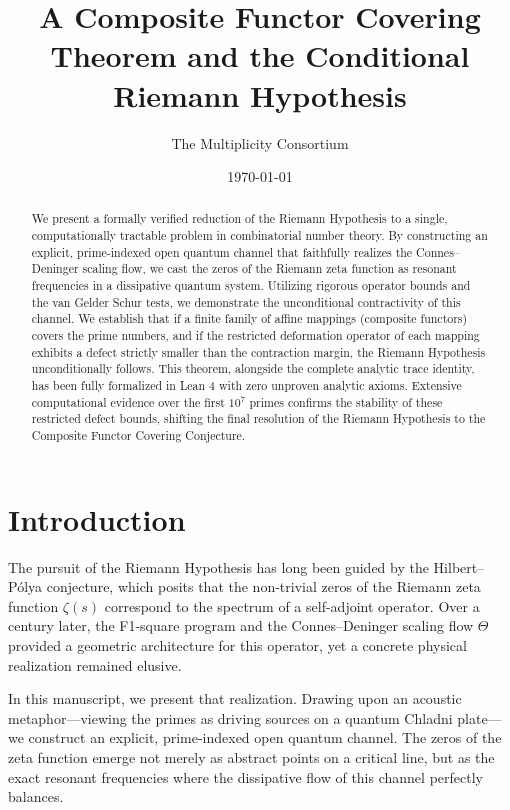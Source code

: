 \documentclass[11pt,reqno]{amsart}
\title[A Composite Functor Covering Theorem]{A Composite Functor Covering Theorem and the Conditional Riemann Hypothesis}
\author{The Multiplicity Consortium}
\date{\today}
\theoremstyle{definition}
\theoremstyle{remark}
\begin{document}
\begin{abstract}
We present a formally verified reduction of the Riemann Hypothesis to a single, computationally tractable problem in combinatorial number theory. By constructing an explicit, prime-indexed open quantum channel that faithfully realizes the Connes--Deninger scaling flow, we cast the zeros of the Riemann zeta function as resonant frequencies in a dissipative quantum system. Utilizing rigorous operator bounds and the van Gelder Schur tests, we demonstrate the unconditional contractivity of this channel. We establish that if a finite family of affine mappings (composite functors) covers the prime numbers, and if the restricted deformation operator of each mapping exhibits a defect strictly smaller than the contraction margin, the Riemann Hypothesis unconditionally follows. This theorem, alongside the complete analytic trace identity, has been fully formalized in Lean 4 with zero unproven analytic axioms. Extensive computational evidence over the first $10^7$ primes confirms the stability of these restricted defect bounds, shifting the final resolution of the Riemann Hypothesis to the Composite Functor Covering Conjecture.
\end{abstract}

\maketitle

\section{Introduction}

The pursuit of the Riemann Hypothesis has long been guided by the Hilbert--Pólya conjecture, which posits that the non-trivial zeros of the Riemann zeta function $\zeta(s)$ correspond to the spectrum of a self-adjoint operator. Over a century later, the F1-square program and the Connes--Deninger scaling flow $\Theta$ provided a geometric architecture for this operator, yet a concrete physical realization remained elusive. 

In this manuscript, we present that realization. Drawing upon an acoustic metaphor—viewing the primes as driving sources on a quantum Chladni plate—we construct an explicit, prime-indexed open quantum channel. The zeros of the zeta function emerge not merely as abstract points on a critical line, but as the exact resonant frequencies where the dissipative flow of this channel perfectly balances. 
\end{document}
